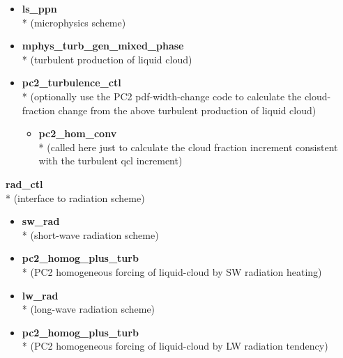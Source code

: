 \begin{itemize}
\begin{itemize}
\begin{tcolorbox}
\begin{itemize}
\begin{tcolorbox}
\begin{itemize}
      \item {\bf ls\_ppn} \\*
      (microphysics scheme)

      \item {\bf mphys\_turb\_gen\_mixed\_phase} \\*
      (turbulent production of liquid cloud)

      \item \textcolor{mygreen}{\bf pc2\_turbulence\_ctl} \\*
      (optionally use the PC2 pdf-width-change code to calculate
       the cloud-fraction change from the above turbulent production
       of liquid cloud)

        \begin{itemize}

        \item \textcolor{mygreen}{\bf pc2\_hom\_conv} \\*
        (called here just to calculate the cloud fraction increment
         consistent with the turbulent qcl increment)

        \end{itemize}

      \end{itemize}
    \end{tcolorbox}

    \begin{tcolorbox}
    \item {\bf rad\_ctl} \\*
    (interface to radiation scheme)
      \begin{itemize}

      \item {\bf sw\_rad} \\*
      (short-wave radiation scheme)

      \item \textcolor{mygreen}{\bf pc2\_homog\_plus\_turb} \\*
      (PC2 homogeneous forcing of liquid-cloud by SW radiation heating)

      \item {\bf lw\_rad} \\*
      (long-wave radiation scheme)

      \item \textcolor{mygreen}{\bf pc2\_homog\_plus\_turb} \\*
      (PC2 homogeneous forcing of liquid-cloud by LW radiation tendency)


\end{itemize}
\end{tcolorbox}
\end{itemize}
\end{tcolorbox}
\end{itemize}
\end{itemize}
